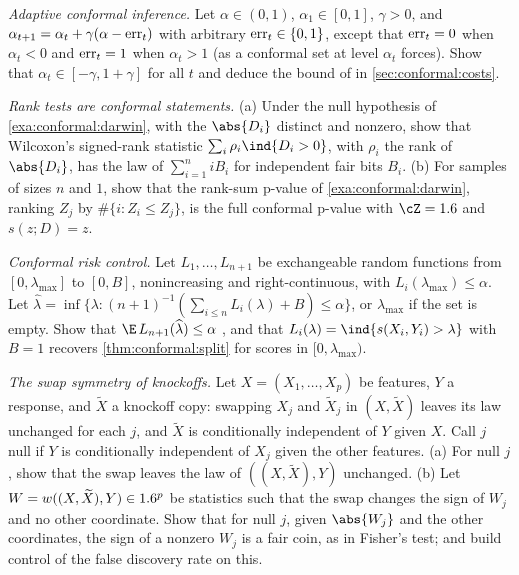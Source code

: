 \begin{refsection}
\begin{exercises}
\item \consolidation\hard \emph{Adaptive conformal inference.} Let $\alpha\in(0,1)$, $\alpha_1\in[0,1]$, $\gamma>0$, and $\alpha_{t+1}=\alpha_t+\gamma(\alpha-\mathrm{err}_t)$ with arbitrary $\mathrm{err}_t\in\{0,1\}$, except that $\mathrm{err}_t=0$ when $\alpha_t<0$ and $\mathrm{err}_t=1$ when $\alpha_t>1$ (as a conformal set at level $\alpha_t$ forces). Show that $\alpha_t\in[-\gamma,1+\gamma]$ for all $t$ and deduce the bound of \textcite{GibbsCandes2021} in \cref{sec:conformal:costs}. \label{ex:conformal:aci}

\item \transfer \emph{Rank tests are conformal statements.} (a) Under the null hypothesis of \cref{exa:conformal:darwin}, with the $\abs{D_i}$ distinct and nonzero, show that Wilcoxon's signed-rank statistic $\sum_i\rho_i\ind\{D_i>0\}$, with $\rho_i$ the rank of $\abs{D_i}$, has the law of $\sum_{i=1}^n iB_i$ for independent fair bits $B_i$. (b) For samples of sizes $n$ and $1$, show that the rank-sum p-value of \cref{exa:conformal:darwin}, ranking $Z_j$ by $\#\{i : Z_i\le Z_j\}$, is the full conformal p-value with $\cZ=\R$ and $s(z;D)=z$.\label{ex:conformal:ranks}

\item \transfer\hard \emph{Conformal risk control.} Let $L_1,\dots,L_{n+1}$ be exchangeable random functions from $[0,\lambda_{\max}]$ to $[0,B]$, nonincreasing and right-continuous, with $L_i(\lambda_{\max})\le\alpha$. Let $\widehat\lambda=\inf\{\lambda : (n+1)^{-1}(\sum_{i\le n}L_i(\lambda)+B)\le\alpha\}$, or $\lambda_{\max}$ if the set is empty. Show that $\E\,L_{n+1}(\widehat\lambda)\le\alpha$ \parencite{Angelopoulos2024b}, and that $L_i(\lambda)=\ind\{s(X_i,Y_i)>\lambda\}$ with $B=1$ recovers \cref{thm:conformal:split} for scores in $[0,\lambda_{\max})$. \label{ex:conformal:crc}

\item \transfer\harder \emph{The swap symmetry of knockoffs.} Let $X=(X_1,\dots,X_p)$ be features, $Y$ a response, and $\widetilde X$ a knockoff copy: swapping $X_j$ and $\widetilde X_j$ in $(X,\widetilde X)$ leaves its law unchanged for each $j$, and $\widetilde X$ is conditionally independent of $Y$ given $X$. Call $j$ null if $Y$ is conditionally independent of $X_j$ given the other features. (a) For null $j$, show that the swap leaves the law of $((X,\widetilde X),Y)$ unchanged. (b) Let $W=w((X,\widetilde X),Y)\in1.6^p$ be statistics such that the swap changes the sign of $W_j$ and no other coordinate. Show that for null $j$, given $\abs{W_j}$ and the other coordinates, the sign of a nonzero $W_j$ is a fair coin, as in Fisher's test; \textcite{BarberCandes2015} and \textcite{Candes2018} build control of the false discovery rate on this. \label{ex:conformal:knockoffs}


\end{exercises}
\end{refsection}

